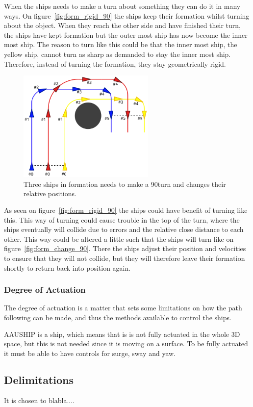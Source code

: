 When the ships needs to make a turn about something they can do it in many ways. On figure~\vref{fig:form_rigid_90} the ships keep their formation whilst turning about the object. When they reach the other side and have finished their turn, the ships have kept formation but the outer most ship has now become the inner most ship. The reason to turn like this could be that the inner most ship, the yellow ship, cannot turn as sharp as demanded to stay the inner most ship. Therefore, instead of turning the formation, they stay geometrically rigid.

\begin{figure}[htbp]
	\centering
	\includegraphics[width=0.6\textwidth]{fig/form_change_90}
	\caption{Three ships in formation needs to make a 90\textdegree turn and changes their relative positions.}
	\label{fig:form_change_90}
\end{figure}

As seen on figure~\vref{fig:form_rigid_90} the ships could have benefit of turning like this. This way of turning could cause trouble in the top of the turn, where the ships eventually will collide due to errors and the relative close distance to each other. This way could be altered a little such that the ships will turn like on figure~\vref{fig:form_change_90}. There the ships adjust their position and velocities to ensure that they will not collide, but they will therefore leave their formation shortly to return back into position again.

\subsubsection{Degree of Actuation}
The degree of actuation is a matter that sets some limitations on how
the path following can be made, and thus the methods available to
control the ships.

AAUSHIP is a ship, which means that is is not fully actuated in the
whole 3D space, but this is not needed since it is moving on a
surface. To be fully actuated it must be able to have controls for
surge, sway and yaw.


\subsection{Delimitations}
It is chosen to blabla....